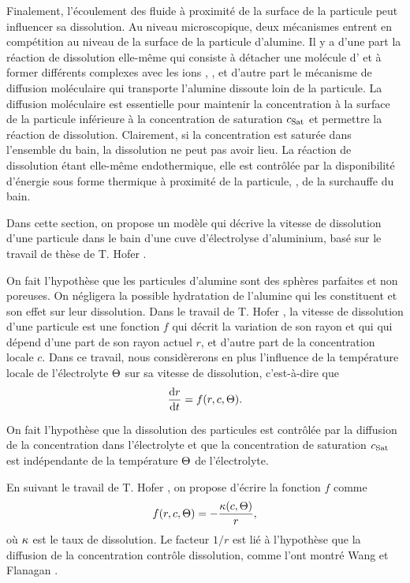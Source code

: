 Finalement, l'écoulement des fluide à proximité de la surface de la
particule peut influencer sa dissolution. Au niveau microscopique,
deux mécanismes entrent en compétition au niveau de la surface de la
particule d'alumine. Il y a d'une part la réaction de dissolution
elle-même qui consiste à détacher une molécule d' et à
former différents complexes avec les ions 
\cite{Haupin1995}, \cite{Kvande1986}, et d'autre part le mécanisme de
diffusion moléculaire qui transporte l'alumine dissoute loin de la
particule. La diffusion moléculaire est essentielle pour maintenir la
concentration à la surface de la particule inférieure à la
concentration de saturation $c_\text{Sat}$ et permettre la réaction de
dissolution. Clairement, si la concentration est saturée dans
l'ensemble du bain, la dissolution ne peut pas avoir lieu. La réaction
de dissolution étant elle-même endothermique, elle est contrôlée par
la disponibilité d'énergie sous forme thermique à proximité de la
particule, \ie, de la surchauffe du bain.

Dans cette section, on propose un modèle qui décrive la vitesse de
dissolution d'une particule dans le bain d'une cuve d'électrolyse
d'aluminium, basé sur le travail de thèse de T. Hofer
\cite{Hofer2011}.

On fait l'hypothèse que les particules d'alumine sont des sphères
parfaites et non poreuses. On négligera la possible hydratation de
l'alumine qui les constituent et son effet sur leur dissolution. Dans
le travail de T. Hofer \cite{Hofer2011}, la vitesse de dissolution
d'une particule est une fonction $f$ qui décrit la variation de son
rayon et qui qui dépend d'une part de son rayon actuel $r$, et d'autre
part de la concentration locale $c$. Dans ce travail, nous
considèrerons en plus l'influence de la température locale de
l'électrolyte $\Theta$ sur sa vitesse de dissolution,
c'est-à-dire que
\begin{equation}\label{eq:radius-edo}
  \frac{\mathrm dr}{\mathrm dt} = f(r, c, \Theta).
\end{equation}

On fait l'hypothèse que la dissolution des particules est
contrôlée par la diffusion de la concentration dans l'électrolyte et
que la concentration de saturation $c_\text{Sat}$ est indépendante de la
température $\Theta$ de l'électrolyte.

En suivant le travail de T. Hofer \cite{Hofer2011}, on propose
d'écrire la fonction $f$ comme
\begin{equation}\label{eq:dissolution-velocity}
  f(r, c, \Theta) = -\frac{\kappa(c, \Theta)}{r},
\end{equation}
où $\kappa$ est le taux de dissolution. Le facteur $1/r$ est
lié à l'hypothèse que la diffusion de la concentration contrôle
dissolution, comme l'ont montré Wang et Flanagan \cite{Wang1999}.

